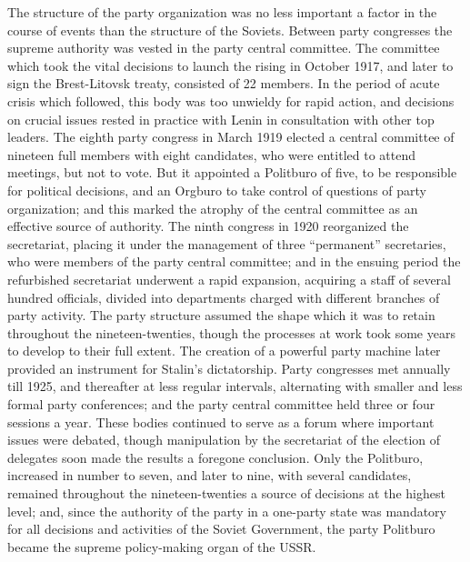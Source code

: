 The structure of the party organization was no less important a factor in the course of events than the structure of the Soviets. Between party congresses the supreme authority was vested in the party central committee. The committee which took the vital decisions to launch the rising in October 1917, and later to sign the Brest-Litovsk treaty, consisted of 22 members. In the period of acute crisis which followed, this body was too unwieldy for rapid action, and decisions on crucial issues rested in practice with Lenin in consultation with other top leaders. The eighth party congress in March 1919 elected a central committee of nineteen full members with eight candidates, who were entitled to attend meetings, but not to vote. But it appointed a Politburo of five, to be responsible for political decisions, and an Orgburo to take control of questions of party organization; and this marked the atrophy of the central committee as an effective source of authority. The ninth congress in 1920 reorganized the secretariat, placing it under the management of three ``permanent'' secretaries, who were members of the party central committee; and in the ensuing period the refurbished secretariat underwent a rapid expansion, acquiring a staff of several hundred officials, divided into departments charged with different branches of party activity. The party structure assumed the shape which it was to retain throughout the nineteen-twenties, though the processes at work took some years to develop to their full extent. The creation of a powerful party machine later provided an instrument for Stalin's dictatorship. Party congresses met annually till 1925, and thereafter at less regular intervals, alternating with smaller and less formal party conferences; and the party central committee held three or four sessions a year. These bodies continued to serve as a forum where important issues were debated, though manipulation by the secretariat of the election of delegates soon made the results a foregone conclusion. Only the Politburo, increased in number to seven, and later to nine, with several candidates, remained throughout the nineteen-twenties a source of decisions at the highest level; and, since the authority of the party in a one-party state was mandatory for all decisions and activities of the Soviet Government, the party Politburo became the supreme policy-making organ of the USSR. 

